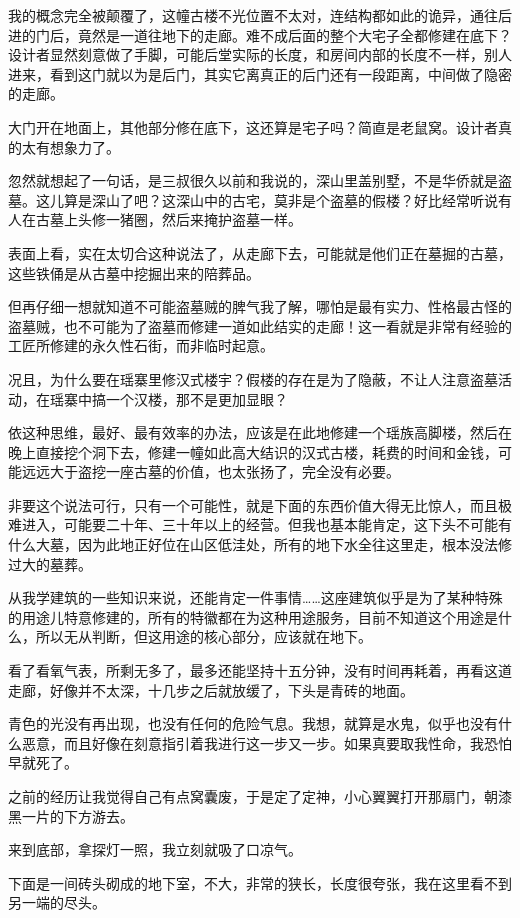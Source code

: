 我的概念完全被颠覆了，这幢古楼不光位置不太对，连结构都如此的诡异，通往后进的门后，竟然是一道往地下的走廊。难不成后面的整个大宅子全都修建在底下？设计者显然刻意做了手脚，可能后堂实际的长度，和房间内部的长度不一样，别人进来，看到这门就以为是后门，其实它离真正的后门还有一段距离，中间做了隐密的走廊。

大门开在地面上，其他部分修在底下，这还算是宅子吗？简直是老鼠窝。设计者真的太有想象力了。

忽然就想起了一句话，是三叔很久以前和我说的，深山里盖别墅，不是华侨就是盗墓。这儿算是深山了吧？这深山中的古宅，莫非是个盗墓的假楼？好比经常听说有人在古墓上头修一猪圈，然后来掩护盗墓一样。

表面上看，实在太切合这种说法了，从走廊下去，可能就是他们正在墓掘的古墓，这些铁俑是从古墓中挖掘出来的陪葬品。

但再仔细一想就知道不可能盗墓贼的脾气我了解，哪怕是最有实力、性格最古怪的盗墓贼，也不可能为了盗墓而修建一道如此结实的走廊！这一看就是非常有经验的工匠所修建的永久性石街，而非临时起意。

况且，为什么要在瑶寨里修汉式楼宇？假楼的存在是为了隐蔽，不让人注意盗墓活动，在瑶寨中搞一个汉楼，那不是更加显眼？

依这种思维，最好、最有效率的办法，应该是在此地修建一个瑶族高脚楼，然后在晚上直接挖个洞下去，修建一幢如此高大结识的汉式古楼，耗费的时间和金钱，可能远远大于盗挖一座古墓的价值，也太张扬了，完全没有必要。

非要这个说法可行，只有一个可能性，就是下面的东西价值大得无比惊人，而且极难进入，可能要二十年、三十年以上的经营。但我也基本能肯定，这下头不可能有什么大墓，因为此地正好位在山区低洼处，所有的地下水全往这里走，根本没法修过大的墓葬。

从我学建筑的一些知识来说，还能肯定一件事情……这座建筑似乎是为了某种特殊的用途儿特意修建的，所有的特徽都在为这种用途服务，目前不知道这个用途是什么，所以无从判断，但这用途的核心部分，应该就在地下。

看了看氧气表，所剩无多了，最多还能坚持十五分钟，没有时间再耗着，再看这道走廊，好像并不太深，十几步之后就放缓了，下头是青砖的地面。

青色的光没有再出现，也没有任何的危险气息。我想，就算是水鬼，似乎也没有什么恶意，而且好像在刻意指引着我进行这一步又一步。如果真要取我性命，我恐怕早就死了。

之前的经历让我觉得自己有点窝囊废，于是定了定神，小心翼翼打开那扇门，朝漆黑一片的下方游去。

来到底部，拿探灯一照，我立刻就吸了口凉气。

下面是一间砖头砌成的地下室，不大，非常的狭长，长度很夸张，我在这里看不到另一端的尽头。


